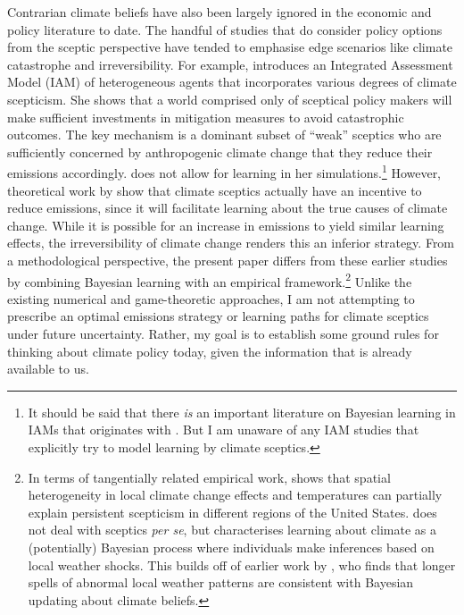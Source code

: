 \documentclass[smallextended]{svjour3}       %
\begin{document}
Contrarian climate beliefs have also been largely ignored in the
economic and policy literature to date. The handful of studies that do
consider policy options from the sceptic perspective have tended to
emphasise edge scenarios like climate catastrophe and irreversibility.
For example, \cite{kiseleva2016heterogeneous} introduces an Integrated
Assessment Model (IAM) of heterogeneous agents that incorporates various
degrees of climate scepticism. She shows that a world comprised only of
sceptical policy makers will make sufficient investments in mitigation
measures to avoid catastrophic outcomes. The key mechanism is a dominant
subset of ``weak'' sceptics who are sufficiently concerned by
anthropogenic climate change that they reduce their emissions
accordingly. \cite{kiseleva2016heterogeneous} does not allow for
learning in her simulations.\footnote{It should be said that there
  \emph{is} an important literature on Bayesian learning in IAMs that
  originates with \cite{kelly1999learning}. But I am unaware of any IAM
  studies that explicitly try to model learning by climate sceptics.}
However, theoretical work by \cite{wijnbergen2015skeptics} show that
climate sceptics actually have an incentive to reduce emissions, since
it will facilitate learning about the true causes of climate change.
While it is possible for an increase in emissions to yield similar
learning effects, the irreversibility of climate change renders this an
inferior strategy. From a methodological perspective, the present paper
differs from these earlier studies by combining Bayesian learning with
an empirical framework.\footnote{In terms of tangentially related
  empirical work, \cite{kaufmann2017spatial} shows that spatial
  heterogeneity in local climate change effects and temperatures can
  partially explain persistent scepticism in different regions of the
  United States. \cite{moore2017learning} does not deal with sceptics
  \emph{per se}, but characterises learning about climate as a
  (potentially) Bayesian process where individuals make inferences based
  on local weather shocks. This builds off of earlier work by
  \cite{deryugina2013update}, who finds that longer spells of abnormal
  local weather patterns are consistent with Bayesian updating about
  climate beliefs.} Unlike the existing numerical and game-theoretic
approaches, I am not attempting to prescribe an optimal emissions
strategy or learning paths for climate sceptics under future
uncertainty. Rather, my goal is to establish some ground rules for
thinking about climate policy today, given the information that is
already available to us.
\end{document}
